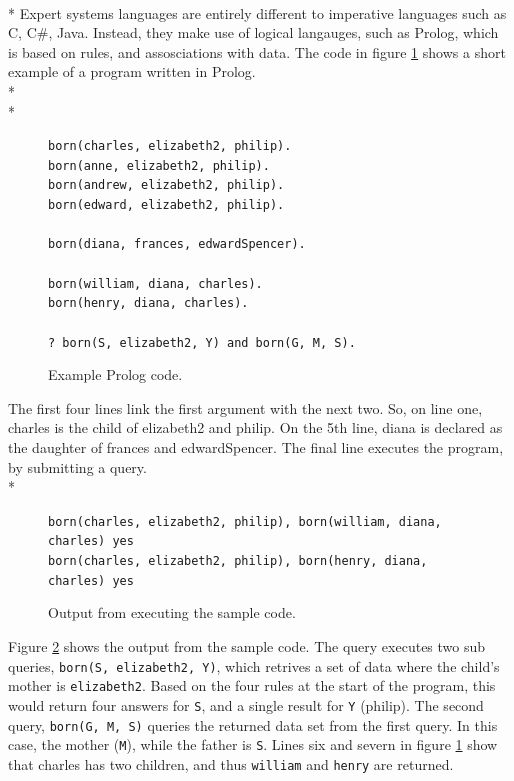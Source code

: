 \documentclass[12pt]{report}
\begin{document}
\\*
Expert systems languages are entirely different to imperative languages such as C, C\#, Java.  Instead, they make use of logical langauges, such as Prolog, which is based on rules, and assosciations with data.  The code in figure \ref{fig:prolog_code} shows a short example of a program written in Prolog.
\\*
\\*
\begin{figure}[H]
\texttt{born(charles, elizabeth2, philip).\\
born(anne,    elizabeth2, philip).\\
born(andrew,  elizabeth2, philip).\\
born(edward,  elizabeth2, philip).\\
\\
born(diana,   frances,    edwardSpencer).\\
\\
born(william, diana,      charles).\\
born(henry,   diana,      charles).\\
\\
? born(S, elizabeth2, Y) and born(G, M, S).}
\caption{Example Prolog code.\citep{thehouseofwindsor}}
\label{fig:prolog_code}
\end{figure}
The first four lines link the first argument with the next two.  So, on line one, charles is the child of elizabeth2 and philip.  On the 5th line, diana is declared as the daughter of frances and edwardSpencer.  The final line executes the program, by submitting a query.
\\*
\begin{figure}[H]
\texttt{born(charles, elizabeth2, philip), born(william, diana, charles) yes\\
born(charles, elizabeth2, philip), born(henry, diana, charles) yes}
\caption{Output from executing the sample code.}
\label{fig:prolog_output}
\end{figure}
Figure \ref{fig:prolog_output} shows the output from the sample code.  The query executes two sub queries, \texttt{born(S, elizabeth2, Y)}, which retrives a set of data where the child's mother is \texttt{elizabeth2}.  Based on the four rules at the start of the program, this would return four answers for \texttt{S}, and a single result for \texttt{Y} (philip).  The second query, \texttt{born(G, M, S)} queries the returned data set from the first query.  In this case, the mother (\texttt{M}), while the father is \texttt{S}.  Lines six and severn in figure \ref{fig:prolog_code} show that charles has two children, and thus \texttt{william} and \texttt{henry} are returned.
\clearpage
\end{document}
